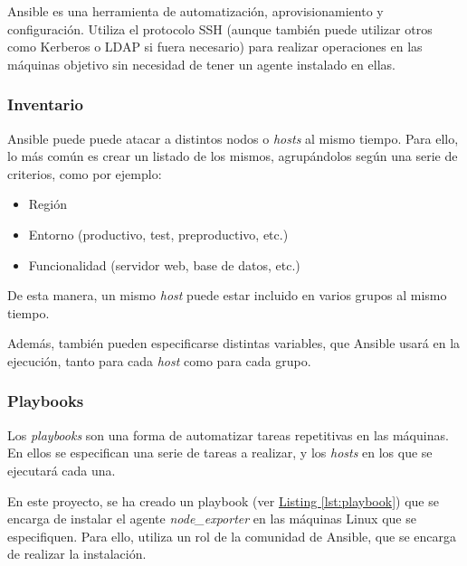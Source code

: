 Ansible\cite{ansible} es una herramienta de automatización, aprovisionamiento y configuración. Utiliza el protocolo SSH (aunque también puede utilizar otros como Kerberos o LDAP si fuera necesario) para realizar operaciones en las máquinas objetivo sin necesidad de tener un agente instalado en ellas.
\subsubsection{Inventario}
Ansible puede puede atacar a distintos nodos o \textit{hosts} al mismo tiempo. Para ello, lo más común es crear un listado de los mismos, agrupándolos según una serie de criterios, como por ejemplo:
\begin{itemize}
    \item Región
    \item Entorno (productivo, test, preproductivo, etc.)
    \item Funcionalidad (servidor web, base de datos, etc.)
\end{itemize}
De esta manera, un mismo \textit{host} puede estar incluido en varios grupos al mismo tiempo.

Además, también pueden especificarse distintas variables, que Ansible usará en la ejecución, tanto para cada \textit{host} como para cada grupo.

\subsubsection{Playbooks}
Los \textit{playbooks} son una forma de automatizar tareas repetitivas en las máquinas. En ellos se especifican una serie de tareas a realizar, y los \textit{hosts} en los que se ejecutará cada una. 

En este proyecto, se ha creado un playbook (ver \hyperref[lst:playbook]{Listing \ref{lst:playbook}}) que se encarga de instalar el agente \textit{node\_exporter} en las máquinas Linux que se especifiquen. Para ello, utiliza un rol de la comunidad de Ansible, que se encarga de realizar la instalación.

